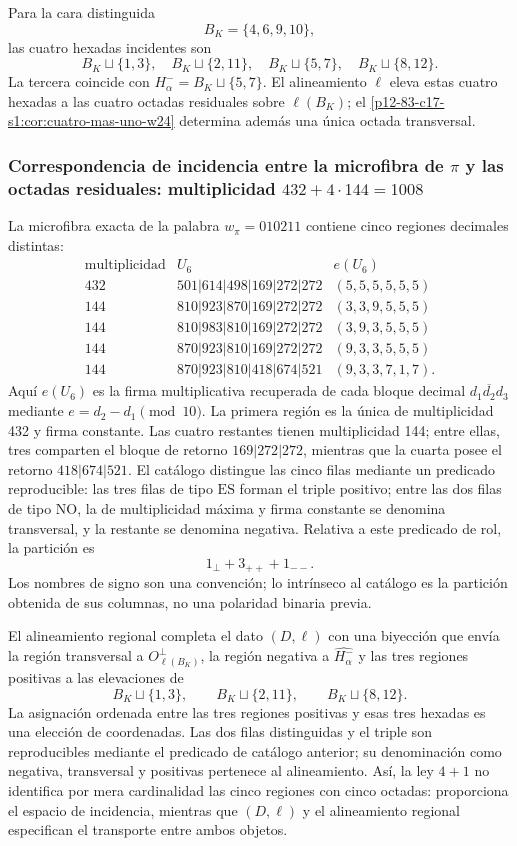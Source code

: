 Para la cara distinguida
\[
 B_K=\{4,6,9,10\},
\]
las cuatro hexadas incidentes son
\[
 B_K\sqcup\{1,3\},\quad
 B_K\sqcup\{2,11\},\quad
 B_K\sqcup\{5,7\},\quad
 B_K\sqcup\{8,12\}.
\]
La tercera coincide con
\(H_\alpha^-=B_K\sqcup\{5,7\}\). El alineamiento \(\ell\) eleva estas
cuatro hexadas a las cuatro octadas residuales sobre \(\ell(B_K)\); el
\cref{p12-83-c17-s1:cor:cuatro-mas-uno-w24} determina además una única octada transversal.

\subsubsection{Correspondencia de incidencia entre la microfibra de \texorpdfstring{\(\pi\)}{pi} y las octadas residuales: multiplicidad \texorpdfstring{\(432+4\cdot144=1008\)}{432+4x144=1008}}

La microfibra exacta de la palabra
\(w_\pi=010211\) contiene cinco regiones decimales distintas:
\[
\begin{array}{c|c|c}
\text{multiplicidad}&U_6& e(U_6)\\
\hline
432&501|614|498|169|272|272&(5,5,5,5,5,5)\\
144&810|923|870|169|272|272&(3,3,9,5,5,5)\\
144&810|983|810|169|272|272&(3,9,3,5,5,5)\\
144&870|923|810|169|272|272&(9,3,3,5,5,5)\\
144&870|923|810|418|674|521&(9,3,3,7,1,7).
\end{array}
\]
Aquí \(e(U_6)\) es la firma multiplicativa recuperada de cada bloque
decimal \(\overline{d_1d_2d_3}\) mediante
\(e=d_2-d_1\pmod {10}\). La primera región es la única de multiplicidad
432 y firma constante. Las cuatro restantes tienen multiplicidad 144; entre
ellas, tres comparten el bloque de retorno \(169|272|272\), mientras que la
cuarta posee el retorno \(418|674|521\). El catálogo distingue las cinco
filas mediante un predicado reproducible: las tres filas de tipo
\(\mathrm{ES}\) forman el triple positivo; entre las dos filas de tipo
\(\mathrm{NO}\), la de multiplicidad máxima y firma constante se denomina
transversal, y la restante se denomina negativa. Relativa a este predicado de
rol, la partición es
\[
 \boxed{1_\perp+3_{++}+1_{--}.}
\]
Los nombres de signo son una convención; lo intrínseco al catálogo es la
partición obtenida de sus columnas, no una polaridad binaria previa.

El alineamiento regional completa el dato \((D,\ell)\) con una biyección
que envía la región transversal a \(O_{\ell(B_K)}^\perp\), la región
negativa a \(\widehat{H_\alpha^-}\) y las tres regiones positivas a las
elevaciones de
\[
 B_K\sqcup\{1,3\},\qquad
 B_K\sqcup\{2,11\},\qquad
 B_K\sqcup\{8,12\}.
\]
La asignación ordenada entre las tres regiones positivas y esas tres hexadas
es una elección de coordenadas. Las dos filas distinguidas y el triple son
reproducibles mediante el predicado de catálogo anterior; su denominación como
negativa, transversal y positivas pertenece al alineamiento. Así, la ley \(4+1\) no identifica por mera
cardinalidad las cinco regiones con cinco octadas: proporciona el espacio de
incidencia, mientras que \((D,\ell)\) y el alineamiento regional especifican
el transporte entre ambos objetos.

